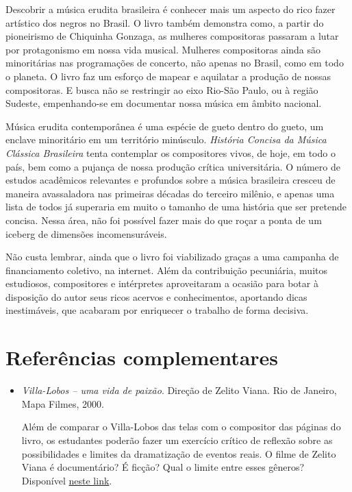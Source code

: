 \documentclass[11pt]{extarticle}
\begin{document}
Descobrir a música erudita brasileira é conhecer mais um aspecto do rico
fazer artístico dos negros no Brasil. O livro também demonstra como, a
partir do pioneirismo de Chiquinha Gonzaga, as mulheres compositoras
passaram a lutar por protagonismo em nossa vida musical. Mulheres
compositoras ainda são minoritárias nas programações de concerto, não
apenas no Brasil, como em todo o planeta. O livro faz um esforço de
mapear e aquilatar a produção de nossas compositoras. E busca não se
restringir ao eixo Rio-São Paulo, ou à região Sudeste, empenhando-se em
documentar nossa música em âmbito nacional.

Música erudita contemporânea é uma espécie de gueto dentro do gueto, um
enclave minoritário em um território minúsculo. \emph{História Concisa
da Música Clássica Brasileira} tenta contemplar os compositores vivos,
de hoje, em todo o país, bem como a pujança de nossa produção crítica
universitária. O número de estudos acadêmicos relevantes e profundos
sobre a música brasileira cresceu de maneira avassaladora nas primeiras
décadas do terceiro milênio, e apenas uma lista de todos já superaria em
muito o tamanho de uma história que ser pretende concisa. Nessa área,
não foi possível fazer mais do que roçar a ponta de um iceberg de
dimensões incomensuráveis.

Não custa lembrar, ainda que o livro foi viabilizado graças a uma
campanha de financiamento coletivo, na internet. Além da contribuição
pecuniária, muitos estudiosos, compositores e intérpretes aproveitaram a
ocasião para botar à disposição do autor seus ricos acervos e
conhecimentos, aportando dicas inestimáveis, que acabaram por enriquecer
o trabalho de forma decisiva.


\section{Referências complementares}

\begin{itemize}
\item 
\emph{Villa-Lobos -- uma vida de paixão}. Direção de Zelito Viana. Rio
de Janeiro, Mapa Filmes, 2000.

Além de comparar o Villa-Lobos das telas com o compositor das
páginas do livro, os estudantes poderão fazer um exercício crítico de
reflexão sobre as possibilidades e limites da dramatização de eventos
reais. O filme de Zelito Viana é documentário? É ficção? Qual o limite
entre esses gêneros? Disponível \href{https://www.youtube.com/watch?v=5WFFxGjxUv4
}{neste link}.
\end{itemize}
\end{document}
